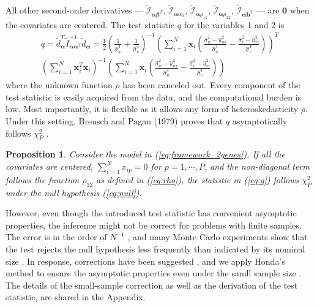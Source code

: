 \documentclass[aoas,preprint]{imsart}
\numberwithin{equation}{section}
\theoremstyle{plain}
\newtheorem{prop}{Proposition}
\begin{document}
All other second-order derivatives --- 
$\tilde{\mathcal{I}}_{\bm{\alpha}\bm{\beta}^T}$,
$\tilde{\mathcal{I}}_{\bm{\alpha}\alpha_0}$,
$\tilde{\mathcal{I}}_{\bm{\alpha}\rho_{11}}$,
$\tilde{\mathcal{I}}_{\bm{\alpha}\rho_{22}}$,
$\tilde{\mathcal{I}}_{\bm{\alpha}\bm{b}^T}$ --- are $\bm{0}$ when the covariates are centered. The test statistic $q$ for the variables 1 and 2 is
\begin{equation}
    \begin{multlined}
    q = \tilde{d}_{\bm{\alpha}}^T \tilde{I}_{\bm{\alpha}\bm{\alpha}^T}^{-1}
    \tilde{d}_{\bm{\alpha}}
    =\frac{1}{2}\left( \frac{1}{\hat{\sigma}_w^4}+\frac{1}{\hat{\sigma}_v^4}\right)^{-1}
\left(\sum_{i=1}^{N} \bm{x}_{i} 
\left(
\frac{\hat{\sigma}_w^2-\hat{u}_{wi}^2}{\hat{\sigma}_w^4}- \frac{\hat{\sigma}_v^2-\hat{u}_{vi}^2}{\hat{\sigma}_v^4}
\right)
\right)^T \\
\left( \sum_{i=1}^{N} \bm{x}_i^T \bm{x}_i \right)^{-1}
\left(
\sum_{i=1}^{N} \bm{x}_{i} 
\left(
\frac{\hat{\sigma}_w^2-\hat{u}_{wi}^2}{\hat{\sigma}_w^4}- \frac{\hat{\sigma}_v^2-\hat{u}_{vi}^2}{\hat{\sigma}_v^4}
\right)
\right)
    \end{multlined}
    \label{eq:q}
\end{equation}
where the unknown function $\rho$ has been canceled out. Every component of the test statistic is easily acquired from the data, and the computational burden is low. Most importantly, it is flexible as it allows any form of heteroskedasticity $\rho$. Under this setting, Breusch and Pagan (1979)  proves that $q$ asymptotically follows $\chi_{P}^2$ \cite{breusch1979simple}.
\begin{prop}
Consider the model in (\ref{eq:framework_2genes}). If all the covariates are centered, $\sum_{i=1}^{N} x_{ip} = 0$ for $p = 1, \cdots, P$, and the non-diagonal term follows the function $\rho_{12}$ as defined in (\ref{eq:rho}), the statistic in (\ref{eq:q}) follows $\chi_P^2$ under the null hypothesis (\ref{eq:null}). 
\label{theorem:q}
\end{prop}
However, even though the introduced test statistic has convenient asymptotic properties, the inference might not be correct for problems with finite samples. The error is in the order of $N^{-1}$ \cite{harris1985asymptotic}, and many Monte Carlo experiments show that the test rejects the null hypothesis less frequently than indicated by its nominal size \cite{ godfrey1978testing, griffiths1986monte,honda1988size} . In response, corrections have been suggested \cite{cribari2001monotonic, harris1985asymptotic, honda1988size}, and we apply Honda's method to ensure the asymptotic properties even under the samll sample size \cite{honda1988size}. The details of the small-sample correction as well as the derivation of the test statistic, are shared in the Appendix.\\
\end{document}
